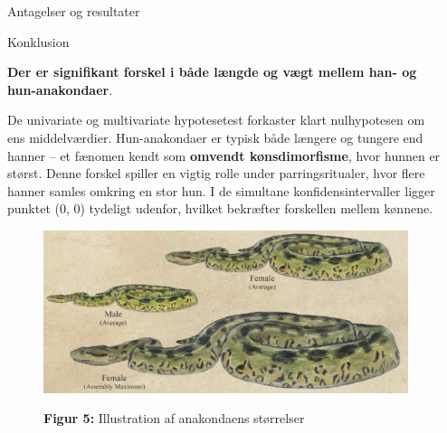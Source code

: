 \documentclass[final]{beamer}
\newlength{\sepwidth}
\newlength{\colwidth}
\newcommand{\separatorcolumn}{\begin{column}{\sepwidth}\end{column}}
\begin{document}
\begin{frame}[t]
\begin{columns}[t]
\begin{column}{\colwidth}
\begin{block}{Antagelser og resultater}
\end{block}
  


\vspace{-1em} 
\begin{block}{Konklusion}
  \justifying
	
\textbf{Der er signifikant forskel i både længde og vægt mellem han- og hun-anakondaer}. 

	\vspace{0.10em}

	
	De univariate og multivariate hypotesetest forkaster klart nulhypotesen om ens middelværdier. Hun-anakondaer er typisk både længere og tungere end hanner – et fænomen kendt som \textbf{omvendt kønsdimorfisme}, hvor hunnen er størst. Denne forskel spiller en vigtig rolle under parringsritualer, hvor flere hanner samles omkring en stor hun. I de simultane konfidensintervaller ligger punktet (0, 0) tydeligt udenfor, hvilket bekræfter forskellen mellem kønnene.

\end{block}


  	\vspace{-1em} 
  	\begin{figure}[h!]
		\centering
		\includegraphics[width=1\linewidth]{plots/snake.png}
  		
		\textbf{\textcolor{junglegreen}{Figur 5:}} Illustration af anakondaens størrelser
	\end{figure}

\end{column}

\separatorcolumn
\end{columns}
\end{frame}
\end{document}
